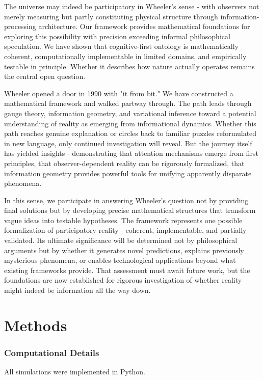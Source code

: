 \documentclass[11pt]{article}
\begin{document}
The universe may indeed be participatory in Wheeler's sense - with observers not merely measuring but partly constituting physical structure through information-processing architecture. Our framework provides mathematical foundations for exploring this possibility with precision exceeding informal philosophical speculation. We have shown that cognitive-first ontology is mathematically coherent, computationally implementable in limited domains, and empirically testable in principle. Whether it describes how nature actually operates remains the central open question.

Wheeler opened a door in 1990 with "it from bit." We have constructed a mathematical framework and walked partway through. The path leads through gauge theory, information geometry, and variational inference toward a potential understanding of reality as emerging from informational dynamics. Whether this path reaches genuine explanation or circles back to familiar puzzles reformulated in new language, only continued investigation will reveal. But the journey itself has yielded insights - demonstrating that attention mechanisms emerge from first principles, that observer-dependent reality can be rigorously formalized, that information geometry provides powerful tools for unifying apparently disparate phenomena.

In this sense, we participate in answering Wheeler's question not by providing final solutions but by developing precise mathematical structures that transform vague ideas into testable hypotheses. The framework represents one possible formalization of participatory reality - coherent, implementable, and partially validated. Its ultimate significance will be determined not by philosophical arguments but by whether it generates novel predictions, explains previously mysterious phenomena, or enables technological applications beyond what existing frameworks provide. That assessment must await future work, but the foundations are now established for rigorous investigation of whether reality might indeed be information all the way down.

\section{Methods}
\subsubsection{Computational Details}
All simulations were implemented in Python.
\end{document}
